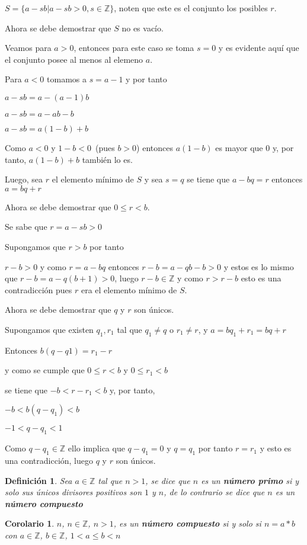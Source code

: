 \documentclass[a4paper,1pt]{report}
\newtheorem*{cor}{Corolario}
\newtheorem*{dfn}{Definición}
\begin{document}
$S=\{a-sb|a-sb>0, s\in\mathbb{Z}\}$, noten que este es el conjunto los posibles $r$.

Ahora se debe demostrar que $S$ no es vacío.

Veamos para $a>0$, entonces para este caso se toma $s=0$ y es evidente aquí que el conjunto posee al menos al elemeno $a$.

Para $a<0$ tomamos a $s=a-1$ y por tanto

$a-sb=a-(a-1)b$

$a-sb=a-ab-b$

$a-sb=a(1-b)+b$

Como $a<0$ y $1-b<0$~(pues $b>0$) entonces $a(1-b)$ es mayor que 0 y, por tanto, $a(1-b)+b$ también lo es.

Luego, sea $r$ el elemento mínimo de $S$ y sea $s=q$ se tiene que $a-bq=r$ entonces $a=bq+r$

Ahora se debe demostrar que $0\leq r < b$.

Se sabe que $r=a-sb>0$

Supongamos que $r>b$ por tanto

$r-b>0$ y como $r=a-bq$ entonces $r-b=a-qb-b>0$ y estos es lo mismo que $r-b=a-q(b+1)>0$, luego $r-b\in\mathbb{Z}$ y como $r>r-b$ esto es una contradicción pues $r$ era el elemento mínimo de $S$.

Ahora se debe demostrar que $q$ y $r$ son únicos.

Supongamos que existen $q_1,r_1$ tal que $q_1\neq q$ o $r_1\neq r$, y $a=bq_1+r_1=bq+r$

Entonces $b(q-q1)=r_1-r$

y como se cumple que $0\leq r < b$ y $0\leq r_1 < b$

se tiene que $-b<r-r_1<b$ y, por tanto,

$-b<b(q-q_1)<b$

$-1<q-q_1<1$

Como $q-q_1\in\mathbb{Z}$ ello implica que $q-q_1=0$ y $q=q_1$ por tanto $r = r_1$ y esto es una contradicción, luego $q$ y $r$ son únicos.



\begin{dfn}
 Sea $a\in\mathbb{Z}$ tal que $n>1$, se dice que $n$ es un \textbf{número primo} si y solo sus únicos divisores positivos son $1$ y $n$, de lo contrario se dice que $n$ es un \textbf{número compuesto}
\end{dfn}

\begin{cor}
 $n$, $n\in\mathbb{Z}$, $n>1$, es un \textbf{número compuesto} si y solo si $n=a*b$ con $a\in\mathbb{Z}$, $b\in\mathbb{Z}$, $1<a\leq b < n$
\end{cor}
\end{document}
